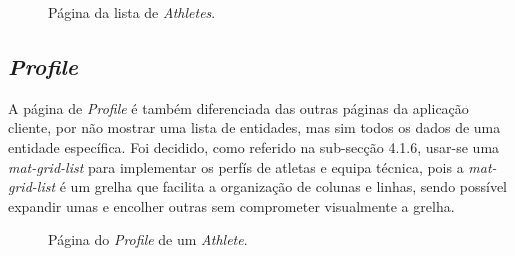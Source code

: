\begin{figure}[h]
	\begin{center}
	\end{center}
	\caption{Página da lista de \textit{Athletes}.}\label{fig:athletelist}
\end{figure}


\subsection{\textit{Profile}}\label{subsec424}
A página de \textit{Profile} é também diferenciada das outras páginas da aplicação cliente, por não mostrar uma lista de entidades, mas sim todos os dados de uma entidade específica. 
Foi decidido, como referido na sub-secção 4.1.6, usar-se uma \textit{mat-grid-list} para implementar os perfís de atletas e equipa técnica, pois a \textit{mat-grid-list} é um grelha que facilita a organização de colunas e linhas, sendo possível expandir umas e encolher outras sem comprometer visualmente a grelha. 
\begin{figure}[h]
	\begin{center}
	\end{center}
	\caption{Página do \textit{Profile} de um \textit{Athlete}.}\label{fig:athleteprofile}
\end{figure}

